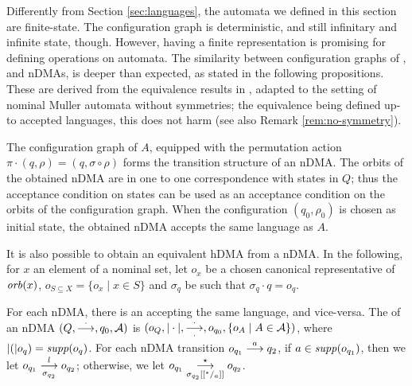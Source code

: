 Differently from Section \ref{sec:languages}, the automata we defined in this section are finite-state. The configuration graph is deterministic, and still infinitary and infinite state, though. However, having a finite representation is promising for defining operations on automata. The similarity between configuration graphs of \hdmas, and nDMAs, is deeper than expected, as stated in the following propositions. These are derived from the equivalence results in \cite{GADDUCCIETAL,STATON}, adapted to the setting of nominal Muller automata without symmetries; the equivalence being defined up-to accepted languages, this does not harm (see also Remark \ref{rem:no-symmetry}).

\begin{proposition}
 The configuration graph of $A$, equipped with the permutation action $\pi \cdot (q,\rho) = (q,\sigma \circ \rho)$ forms the transition structure of an nDMA. The orbits of the obtained nDMA are in one to one correspondence with states in $Q$; thus the acceptance condition on states can be used as an acceptance condition on the orbits of the configuration graph. When the configuration $(q_0,\rho_0)$ is chosen as initial state, the obtained nDMA accepts the same language as $A$.
\end{proposition}

It is also possible to obtain an equivalent hDMA from a nDMA. In the following, for $x$ an element of a nominal set, let $o_x$ be a chosen canonical representative of $\mathit{orb}(x)$, $o_{S \subseteq X} = \{o_x \mid x \in S\}$ and $\sigma_q$ be such that $\sigma_q \cdot q = o_q$. 

\begin{proposition}\label{prop:equivalence-ndma-hdma}
 For each nDMA, there is an \hdma accepting the same language, and vice-versa. The \hdma of an nDMA $(Q,\overset{\cdot}{\longrightarrow},q_0,\mathcal{A})$ is $(o_Q,|\cdot|,\overset{\cdot}{\underset{\cdot}{\longrightarrow}},o_{q_0},\{ o_A \mid A \in \mathcal{A} \})$, where $|(|o_q) = \mathit{supp}(o_q)$. For each nDMA transition $o_{q_1} \overset{a}{\longrightarrow} q_2$, if $a \in \mathit{supp}(o_{q_1})$, then we let $o_{q_1} \overset{l}{\underset{\sigma_{q_2}}{\longrightarrow}} o_{q_2}$; otherwise, we let $o_{q_1} \overset{\star}{\underset{\sigma_{q_2}[[{}^{*}/_{a}]]}{\longrightarrow}} o_{q_2}$.
\end{proposition}

% 
